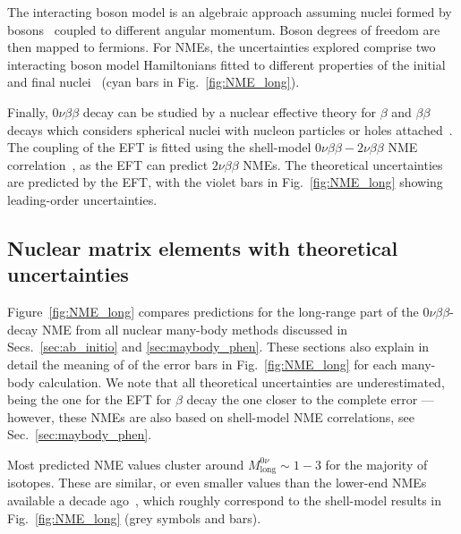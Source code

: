 The interacting boson model is an algebraic approach assuming nuclei formed by bosons~\cite{Iachello:2006fqa} coupled to different angular momentum. Boson degrees of freedom are then mapped to fermions. For NMEs, the uncertainties explored comprise two interacting boson model Hamiltonians fitted to different properties of the initial and final nuclei~\cite{Barea:2015kwa,Deppisch:2020ztt} (cyan bars in Fig.~\ref{fig:NME_long}).

Finally, $0\nu\beta\beta$ decay can be studied by a nuclear effective theory for $\beta$ and $\beta\beta$ decays which considers spherical nuclei with nucleon particles or holes attached~\cite{CoelloPerez:2017xsq,Brase:2021uny}. The coupling of the EFT is fitted using the shell-model $0\nu\beta\beta-2\nu\beta\beta$ NME correlation~\cite{Shimizu:2017qcy}, as the EFT can predict $2\nu\beta\beta$ NMEs. The theoretical uncertainties are predicted by the EFT, with the violet bars in Fig.~\ref{fig:NME_long} showing leading-order uncertainties.

\subsection{Nuclear matrix elements with theoretical uncertainties}
\label{subsec:nme_current}

Figure~\ref{fig:NME_long} compares predictions for the long-range part of the $0\nu\beta\beta$-decay NME from all nuclear many-body methods discussed in Secs.~\ref{sec:ab_initio} and \ref{sec:maybody_phen}. These sections also explain in detail the meaning of of the error bars in Fig.~\ref{fig:NME_long} for each many-body calculation. We note that all theoretical uncertainties are underestimated, being the one for the EFT for $\beta$ decay the one closer to the complete error ---however, these NMEs are also based on shell-model NME correlations, see Sec.~\ref{sec:maybody_phen}.

Most predicted NME values cluster around $M^{0\nu}_\text{long}\sim1-3$ for the majority of isotopes. These are similar, or even smaller values than the lower-end NMEs available a decade ago~\cite{Gomez-Cadenas:2010zcc}, which roughly correspond to the shell-model results in Fig.~\ref{fig:NME_long} (grey symbols and bars).

